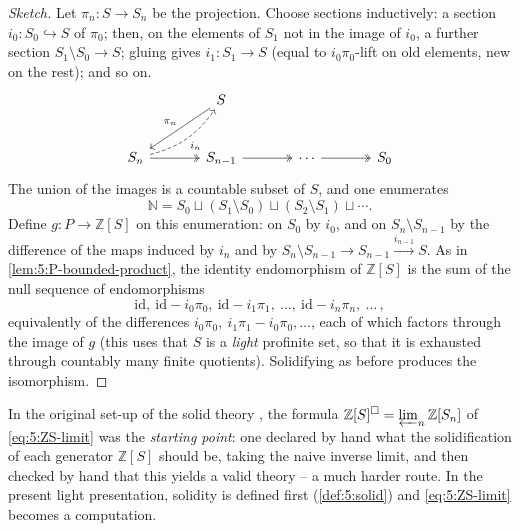 \begin{proof}[Sketch]
Let $\pi_{n}\colon S\to S_{n}$ be the projection. Choose sections inductively: a
section $i_{0}\colon S_{0}\hookrightarrow S$ of $\pi_0$; then, on the elements of
$S_{1}$ not in the image of $i_{0}$, a further section $S_{1}\setminus S_{0}\to S$;
gluing gives $i_{1}\colon S_{1}\to S$ (equal to $i_0\pi_0$-lift on old elements,
new on the rest); and so on.
\[
\begin{tikzcd}[row sep=large, column sep=large]
& S \arrow[ld, "\pi_n"'] & \\
S_n \arrow[r, two heads] \arrow[ru, bend right=20, dashed, "i_n"'] & S_{n-1} \arrow[r, two heads] & \cdots \arrow[r, two heads] & S_0
\end{tikzcd}
\]
The union of the images is a countable subset of $S$, and one enumerates
\begin{equation*}
\mathbb{N}=S_{0}\sqcup(S_{1}\setminus S_{0})\sqcup(S_{2}\setminus S_{1})\sqcup\cdots .
\end{equation*}
Define $g\colon P\to\mathbb{Z}[S]$ on this enumeration: on $S_{0}$ by $i_{0}$, and
on $S_{n}\setminus S_{n-1}$ by the difference of the maps induced by $i_{n}$ and by
$S_{n}\setminus S_{n-1}\to S_{n-1}\xrightarrow{i_{n-1}}S$. As in
\cref{lem:5:P-bounded-product}, the identity endomorphism of $\mathbb{Z}[S]$ is the
sum of the null sequence of endomorphisms
\begin{equation*}
\mathrm{id},\ \mathrm{id}-i_{0}\pi_{0},\ \mathrm{id}-i_{1}\pi_{1},\ \dots,\
\mathrm{id}-i_{n}\pi_{n},\ \dots\,,
\end{equation*}
equivalently of the differences $i_{0}\pi_{0},\ i_{1}\pi_{1}-i_{0}\pi_{0},\dots$,
each of which factors through the image of $g$ (this uses that $S$ is a
\emph{light} profinite set, so that it is exhausted through countably many finite
quotients). Solidifying as before produces the isomorphism.
\end{proof}

\begin{remark}
\label{rmk:5:was-definition}
In the original set-up of the solid theory
\cite{scholze2019condensed}, the formula $\mathbb{Z}[S]^{\square}=\varprojlim_{n}
\mathbb{Z}[S_{n}]$ of \eqref{eq:5:ZS-limit} was the \emph{starting point}: one
declared by hand what the solidification of each generator $\mathbb{Z}[S]$ should
be, taking the naive inverse limit, and then checked by hand that this yields a
valid theory -- a much harder route. In the present light presentation, solidity
is defined first (\cref{def:5:solid}) and \eqref{eq:5:ZS-limit} becomes a
computation.
\end{remark}

